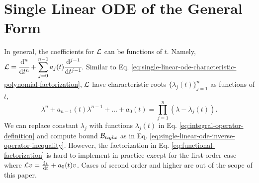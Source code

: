 \section{Single Linear ODE of the General Form}
    In general, the coefficients for $\mathcal{L}$ can be functions of $t$. Namely, $\displaystyle \mathcal{L} = \cfrac{\mathrm{d}^{n} }{\mathrm{d} t^{n}} + \sum_{j=0}^{n-1}a_j(t)\cfrac{\mathrm{d}^{j-1} }{\mathrm{d} t^{j-1}}$.
    Similar to Eq. \eqref{eq:single-linear-ode-characteristic-polynomial-factorization}, $\mathcal{L}$ have characteristic roots $\{\lambda_{j}(t)\}_{j=1}^{n}$ as functions of $t$,
    \begin{equation*} \label{eq:functional-factorization}
        \lambda^n + a_{n-1}(t)\lambda^{n-1} + \dots + a_0(t) = \prod_{j=1}^{n}(\lambda - \lambda_j(t)).
    \end{equation*}
    We can replace constant $\lambda_j$ with functions $\lambda_j(t)$ in Eq. \eqref{eq:integral-operator-definition} and compute bound $\mathcal{B}_{tight}$ as in Eq. \eqref{eq:single-linear-ode-inverse-operator-inequality}.
    However, the factorization in Eq. \eqref{eq:functional-factorization} is hard to implement in practice except for the first-order case  where $\mathcal{L} v = \frac{\mathrm{d}v}{\mathrm{d}t} + a_0(t)v$. 
    Cases of second order and higher are out of the scope of this paper.


